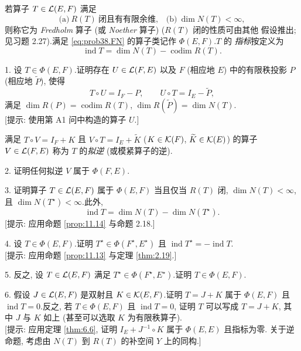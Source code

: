\begin{problem}[第 2, 6, 11 章]

若算子 $T\in\mathcal{L}(E,F)$ 满足
\begin{equation}
\text{(a)}\ R(T)\ \text{闭且有有限余维,}\quad\text{(b)}\ \dim N(T)<\infty,
\tag{FN}
\label{eq:prob38.FN}
\end{equation}
则称它为 \emph{Fredholm} 算子 (或 \emph{Noether} 算子) ($R(T)$ 闭的性质可由其他
假设推出; 见习题 2.27).满足 \eqref{eq:prob38.FN} 的算子类记作 $\Phi(E,F)$.$T$ 的
\emph{指标}按定义为
\begin{equation*}
\operatorname{ind}T=\dim N(T)-\operatorname{codim}R(T).
\end{equation*}

1. 设 $T\in\Phi(E,F)$.证明存在 $U\in\mathcal{L}(F,E)$ 以及 $F$ (相应地 $E$) 中的有限秩投影
$P$ (相应地 $\widetilde P$), 使得
\begin{equation}
T\circ U=I_F-P,\qquad U\circ T=I_E-\widetilde P,
\label{eq:prob38.7}
\end{equation}
满足 $\dim R(P)=\operatorname{codim}R(T)$, $\dim R(\widetilde P)=\dim N(T)$.\\
{[提示: 使用第 A1 问中构造的算子 $U$.]}

满足 $T\circ V=I_F+K$ 且 $V\circ T=I_E+\widetilde K$ ($K\in\mathcal{K}(F)$, $\widetilde K\in\mathcal{K}(E)$)
的算子 $V\in\mathcal{L}(F,E)$ 称为 $T$ 的\emph{拟逆} (或模紧算子的逆).

2. 证明任何拟逆 $V$ 属于 $\Phi(F,E)$.

3. 证明算子 $T\in\mathcal{L}(E,F)$ 属于 $\Phi(E,F)$ 当且仅当 $R(T)$ 闭, $\dim N(T)<\infty$,
且 $\dim N(T^\star)<\infty$.此外,
\begin{equation*}
\operatorname{ind}T=\dim N(T)-\dim N(T^\star).
\end{equation*}
[提示: 应用命题  \ref{prop:11.14} 与命题 2.18.]

4. 设 $T\in\Phi(E,F)$.证明 $T^\star\in\Phi(F^\star,E^\star)$ 且
$\operatorname{ind}T^\star=-\operatorname{ind}T$.\\
{[提示: 应用命题  \ref{prop:11.13} 与定理  \ref{thm:2.19}.]}

5. 反之, 设 $T\in\mathcal{L}(E,F)$ 满足 $T^\star\in\Phi(F^\star,E^\star)$.证明 $T\in\Phi(E,F)$.

6. 假设 $J\in\mathcal{L}(E,F)$ 是双射且 $K\in\mathcal{K}(E,F)$.证明 $T=J+K$ 属于 $\Phi(E,F)$ 且
$\operatorname{ind}T=0$.反之, 若 $T\in\Phi(E,F)$ 且 $\operatorname{ind}T=0$, 证明
$T$ 可以写成 $T=J+K$, 其中 $J$ 与 $K$ 如上 (甚至可以选取 $K$ 为有限秩算子).\\
{[提示: 应用定理  \ref{thm:6.6}, 证明 $I_E+J^{-1}\circ K$ 属于 $\Phi(E,E)$ 且指标为零.
关于逆命题, 考虑由 $N(T)$ 到 $R(T)$ 的补空间 $Y$ 上的同构.]}


\end{problem}
